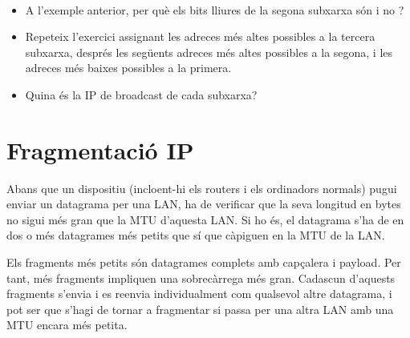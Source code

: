 \begin{exercise}\ \\[-0.5cm]
\begin{itemize}
\item A l'exemple anterior, per què els bits lliures de la segona subxarxa són  
i no ?\\[-0.4cm]

\item Repeteix l'exercici assignant les adreces més altes possibles a la tercera subxarxa,
  després les següents adreces més altes possibles a la segona, 
  i les adreces més baixes possibles a la primera.\\[-0.4cm]
  
\item Quina és la IP de broadcast de cada subxarxa?
\end{itemize}
\end{exercise}


% 
\section{Fragmentació IP}\label{sec:layer3:ip_fragmentation}
\label{sec:layer3:fragmentation}

Abans que un dispositiu (incloent-hi els routers i els ordinadors normals)
pugui enviar un datagrama per una LAN, ha de verificar que la seva longitud en bytes 
no sigui més gran que la MTU d'aquesta LAN. Si ho és, el datagrama s'ha de 
 en dos o més datagrames més petits que sí que càpiguen en la MTU de la LAN.

Els fragments més petits són datagrames complets amb capçalera i payload. Per tant, 
més fragments impliquen una sobrecàrrega més gran. Cadascun d'aquests fragments s'envia 
i es reenvia individualment com qualsevol altre datagrama, i pot ser que s'hagi de tornar a fragmentar 
si passa per una altra LAN amb una MTU encara més petita.

